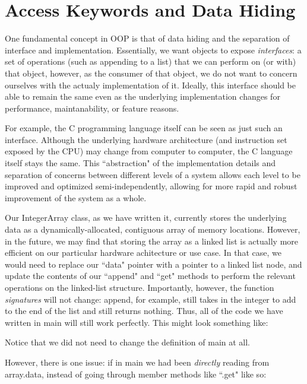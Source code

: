 

\section{Access Keywords and Data Hiding}

One fundamental concept in OOP is that of data hiding and the separation of
interface and implementation. Essentially, we want objects to expose
\textit{interfaces}: a set of operations (such as appending to a list) that we
can perform on (or with) that object, however, as the consumer of that object,
we do not want to concern ourselves with the actualy implementation of it.
Ideally, this interface should be able to remain the same even as the
underlying implementation changes for performance, maintanability, or feature
reasons.

For example, the C programming language itself can be seen as just such an
interface. Although the underlying hardware architecture (and instruction set
exposed by the CPU) may change from computer to computer, the C language itself
stays the same. This ``abstraction" of the implementation details and
separation of concerns between different levels of a system allows each level
to be improved and optimized semi-independently, allowing for more rapid and
robust improvement of the system as a whole.

Our IntegerArray class, as we have written it, currently stores the underlying
data as a dynamically-allocated, contiguous array of memory locations. However,
in the future, we may find that storing the array as a linked list is actually
more efficient on our particular hardware achitecture or use case. In that
case, we would need to replace our ``data" pointer with a pointer to a linked
list node, and update the contents of our ``append" and ``get" methods to
perform the relevant operations on the linked-list structure. Importantly,
however, the function \textit{signatures} will not change: append, for example,
still takes in the integer to add to the end of the list and still returns
nothing. Thus, all of the code we have written in main will still work
perfectly. This might look something like:



Notice that we did not need to change the definition of main at all.

However, there is one issue: if in main we had been \textit{directly} reading
from array.data, instead of going through member methods like ``.get" like so:

